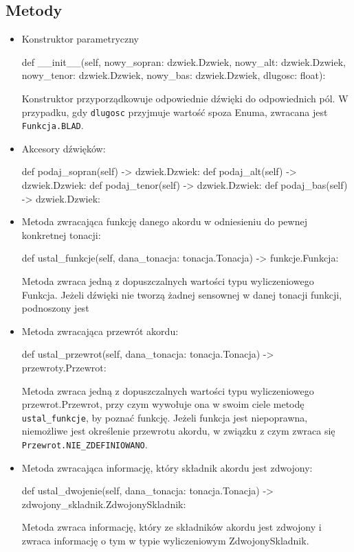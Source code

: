 \documentclass[dokumentacja.tex]{subfiles}
\begin{document}
\subsection{Metody}
\begin{itemize}
    \item Konstruktor parametryczny
        \begin{python}
    def __init__(self, nowy_sopran: dzwiek.Dzwiek, nowy_alt: dzwiek.Dzwiek, nowy_tenor: dzwiek.Dzwiek, nowy_bas: dzwiek.Dzwiek, dlugosc: float):
        \end{python}
        Konstruktor przyporządkowuje odpowiednie dźwięki do odpowiednich pól. W przypadku, gdy \texttt{dlugosc} przyjmuje wartość spoza Enuma, zwracana jest \texttt{Funkcja.BLAD}.

    \item Akcesory dźwięków:
          \begin{python}
    def podaj_sopran(self) -> dzwiek.Dzwiek:
    def podaj_alt(self) -> dzwiek.Dzwiek:
    def podaj_tenor(self) -> dzwiek.Dzwiek:
    def podaj_bas(self) -> dzwiek.Dzwiek:    
          \end{python}

    \item Metoda zwracająca funkcję danego akordu w odniesieniu do pewnej konkretnej tonacji:
        \begin{python}
     def ustal_funkcje(self, dana_tonacja: tonacja.Tonacja) -> funkcje.Funkcja:
        \end{python}
        Metoda zwraca jedną z dopuszczalnych wartości typu wyliczeniowego Funkcja. Jeżeli dźwięki nie tworzą żadnej sensownej w danej tonacji funkcji, podnoszony jest \texttt{}

    \item Metoda zwracająca przewrót akordu:
    \begin{python}
    def ustal_przewrot(self, dana_tonacja: tonacja.Tonacja) -> przewroty.Przewrot:
    \end{python}
    Metoda zwraca jedną z dopuszczalnych wartości typu wyliczeniowego przewrot.Przewrot, przy czym wywołuje ona w swoim ciele metodę \texttt{ustal\_funkcje}, by poznać funkcję. 
    Jeżeli funkcja jest niepoprawna, niemożliwe jest określenie przewrotu akordu, w związku z czym zwraca się \texttt{Przewrot.NIE\_ZDEFINIOWANO}.

    \item Metoda zwracająca informację, który składnik akordu jest zdwojony:
    \begin{python}
    def ustal_dwojenie(self, dana_tonacja: tonacja.Tonacja) -> zdwojony_skladnik.ZdwojonySkladnik:
    \end{python}
    Metoda zwraca informację, który ze składników akordu jest zdwojony i zwraca informację o tym w typie wyliczeniowym ZdwojonySkladnik.
\end{itemize}
\end{document}
